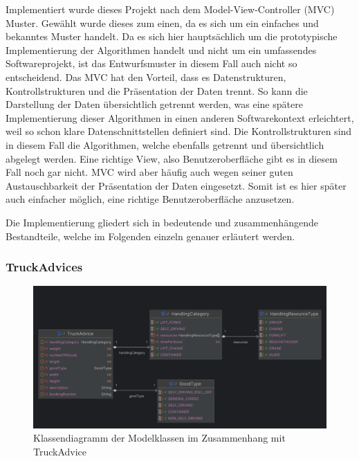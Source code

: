 
Implementiert wurde dieses Projekt nach dem Model-View-Controller (MVC) Muster. Gewählt wurde dieses zum einen, da es sich um ein einfaches und bekanntes Muster handelt. Da es sich hier hauptsächlich um die prototypische Implementierung der Algorithmen handelt und nicht um ein umfassendes Softwareprojekt, ist das Entwurfsmuster in diesem Fall auch nicht so entscheidend. Das MVC hat den Vorteil, dass es Datenstrukturen, Kontrollstrukturen und die Präsentation der Daten trennt. So kann die Darstellung der Daten übersichtlich getrennt werden, was eine spätere Implementierung dieser Algorithmen in einen anderen Softwarekontext erleichtert, weil so schon klare Datenschnittstellen definiert sind. Die Kontrollstrukturen sind in diesem Fall die Algorithmen, welche ebenfalls getrennt und übersichtlich abgelegt werden. Eine richtige View, also Benutzeroberfläche gibt es in diesem Fall noch gar nicht. MVC wird aber häufig auch wegen seiner guten Austauschbarkeit der Präsentation der Daten eingesetzt. Somit ist es hier später auch einfacher möglich, eine richtige Benutzeroberfläche anzusetzen.

Die Implementierung gliedert sich in bedeutende und zusammenhängende Bestandteile, welche im Folgenden einzeln genauer erläutert werden.


\subsubsection{TruckAdvices}

\begin{figure}[H]
    \centering
    \includegraphics[width=\textwidth]{images/classDiagrams/TruckAdvice_ClassDiagram.png}
    \caption{Klassendiagramm der Modelklassen im Zusammenhang mit TruckAdvice}
    \label{fig:classDiagramTruckAdvice}
\end{figure}



